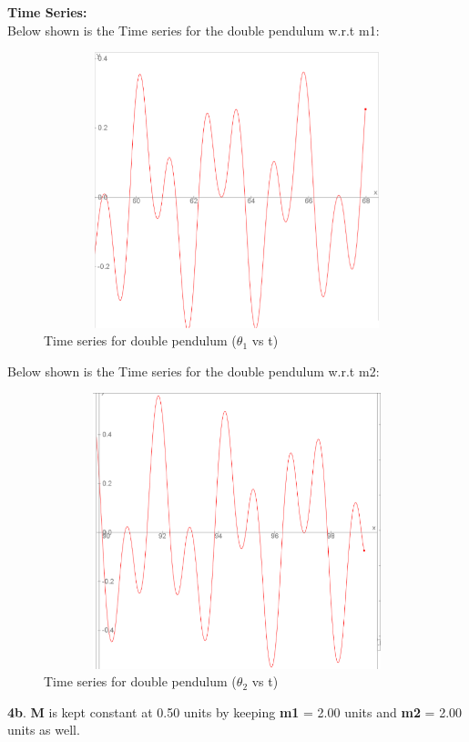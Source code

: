 \documentclass[11pt]{scrartcl} %
\begin{document}
\newpage
\textbf{Time Series:}\\
Below shown is the Time series for the double pendulum w.r.t m1:
\begin{figure}[h] %
	\centering
	\includegraphics[width=12cm, height=8cm]{Figures/M 4a angle 1 (1).png} %
	\caption{Time series for double pendulum ($\theta_{1}$ vs t)}
\end{figure}

Below shown is the Time series for the double pendulum w.r.t m2:
\begin{figure}[h] %
	\centering
	\includegraphics[width=12cm, height=8cm]{Figures/M 4a angle 2.png} %
	\caption{Time series for double pendulum ($\theta_{2}$ vs t)}
\end{figure}


\newpage
\textbf{4b}.
\textbf{M} is kept constant at 0.50 units by keeping \textbf{m1} = 2.00 units and \textbf{m2} = 2.00 units as well.\\
\end{document}
